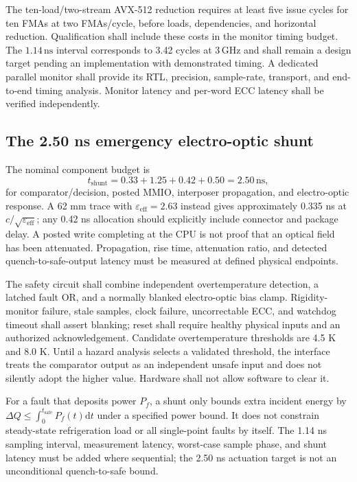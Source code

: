 \documentclass[11pt,a4paper]{article}
\newcommand{\dd}{\mathrm d}
\newcommand{\unit}[1]{\,\mathrm{#1}}
\begin{document}
The ten-load/two-stream AVX-512 reduction requires at least five issue cycles for ten
FMAs at two FMAs/cycle, before loads, dependencies, and horizontal reduction.
Qualification shall include these costs in the monitor timing budget. The
$1.14\unit{ns}$ interval corresponds to 3.42 cycles at $3\unit{GHz}$ and shall
remain a design target pending an implementation with demonstrated timing.
A dedicated parallel monitor shall provide its RTL, precision, sample-rate,
transport, and end-to-end timing analysis. Monitor latency and per-word ECC
latency shall be verified independently.

\subsection{The 2.50 ns emergency electro-optic shunt}
The nominal component budget is
\[
 t_{\mathrm{shunt}}=0.33+1.25+0.42+0.50=2.50\unit{ns},
\]
for comparator/decision, posted MMIO, interposer propagation, and electro-optic response.
A 62 mm trace with $\varepsilon_{\mathrm{eff}}=2.63$ instead gives approximately 0.335 ns
at $c/\sqrt{\varepsilon_{\mathrm{eff}}}$; any 0.42 ns allocation should explicitly include
connector and package delay. A posted write completing at the CPU is not proof that an
optical field has been attenuated. Propagation, rise time, attenuation ratio, and detected
quench-to-safe-output latency must be measured at defined physical endpoints.

The safety circuit shall combine independent overtemperature detection, a latched fault
OR, and a normally blanked electro-optic bias clamp. Rigidity-monitor failure, stale samples,
clock failure, uncorrectable ECC, and watchdog timeout shall assert blanking; reset shall
require healthy physical inputs and an authorized acknowledgement. Candidate overtemperature
thresholds are 4.5 K and 8.0 K. Until a hazard analysis selects a validated
threshold, the interface treats the comparator output as an independent unsafe input and
does not silently adopt the higher value. Hardware shall not allow software to clear it.

For a fault that deposits power $P_f$, a shunt only bounds extra incident energy by
$\Delta Q\le\int_0^{t_{\mathrm{safe}}}P_f(t)\dd t$ under a specified power bound. It does
not constrain steady-state refrigeration load or all single-point faults by itself.
The 1.14 ns sampling interval, measurement latency, worst-case sample phase, and shunt
latency must be added where sequential; the 2.50 ns actuation target is not an unconditional
quench-to-safe bound.
\end{document}
